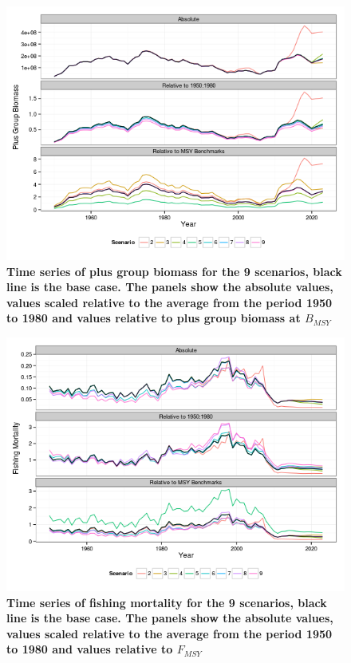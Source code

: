 \documentclass[a4paper, 10pt]{article}
\begin{document}
\begin{figure}[!ht]\begin{center} 
\includegraphics{../figs/om-pg.png}
\end{center}
\caption{\bf{Time series of plus group biomass for the 9 scenarios, black line is the base case. The panels show the absolute values, values scaled relative to 
the average from the period 1950 to 1980 and values relative to plus group biomass at $B_{MSY}$}}
\label{ts-pg}\end{figure} 

\begin{figure}[!ht]\begin{center} 
\includegraphics{../figs/om-f.png}
\end{center}
\caption{\bf{Time series of fishing mortality for the 9 scenarios, black line is the base case. The panels show the absolute values, values scaled relative to 
the average from the period 1950 to 1980 and values relative to $F_{MSY}$}}
\label{ts-f}\end{figure} 
\end{document}
